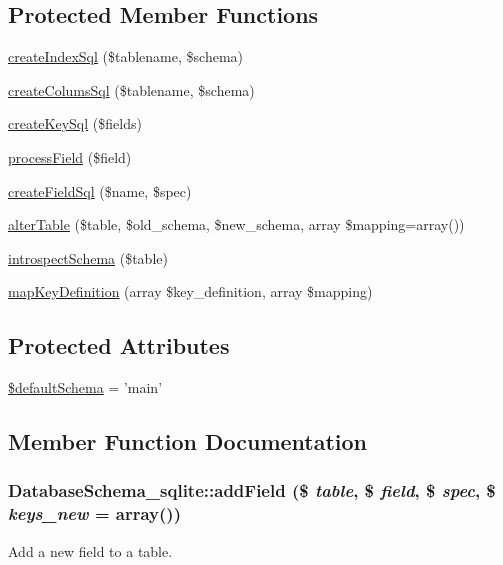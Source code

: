 \subsection*{Protected Member Functions}
\begin{DoxyCompactItemize}
\item 
\hyperlink{classDatabaseSchema__sqlite_aee165c6e7710d1572386f3e886534843}{createIndexSql} (\$tablename, \$schema)
\item 
\hyperlink{classDatabaseSchema__sqlite_a134fb7e8fbeb0ff0f7c8bfa6d73f3da0}{createColumsSql} (\$tablename, \$schema)
\item 
\hyperlink{classDatabaseSchema__sqlite_a49b7b9de049e43a4e5df195e78b2385f}{createKeySql} (\$fields)
\item 
\hyperlink{classDatabaseSchema__sqlite_a3017c0fafd2330a51fe89159c16cd071}{processField} (\$field)
\item 
\hyperlink{classDatabaseSchema__sqlite_a2282f26222ac5d7e08e9ca7d481040fc}{createFieldSql} (\$name, \$spec)
\item 
\hyperlink{classDatabaseSchema__sqlite_a2da2a8f7d621393a63f1ee642462b92c}{alterTable} (\$table, \$old\_\-schema, \$new\_\-schema, array \$mapping=array())
\item 
\hyperlink{classDatabaseSchema__sqlite_a55c7b8fe7ea795bd62c4c8aec8d88f3d}{introspectSchema} (\$table)
\item 
\hyperlink{classDatabaseSchema__sqlite_a0a3875b0867fb7e95508ca54a5958f5d}{mapKeyDefinition} (array \$key\_\-definition, array \$mapping)
\end{DoxyCompactItemize}
\subsection*{Protected Attributes}
\begin{DoxyCompactItemize}
\item 
\hyperlink{classDatabaseSchema__sqlite_ab0f2d6c0731bffc8a88b64cad3a60a3f}{\$defaultSchema} = 'main'
\end{DoxyCompactItemize}


\subsection{Member Function Documentation}
\hypertarget{classDatabaseSchema__sqlite_ae55ed07d32dcc323c699b490e0dc137b}{
\subsubsection[{addField}]{\setlength{\rightskip}{0pt plus 5cm}DatabaseSchema\_\-sqlite::addField (\$ {\em table}, \/  \$ {\em field}, \/  \$ {\em spec}, \/  \$ {\em keys\_\-new} = {\ttfamily array()})}}
\label{classDatabaseSchema__sqlite_ae55ed07d32dcc323c699b490e0dc137b}
Add a new field to a table.



